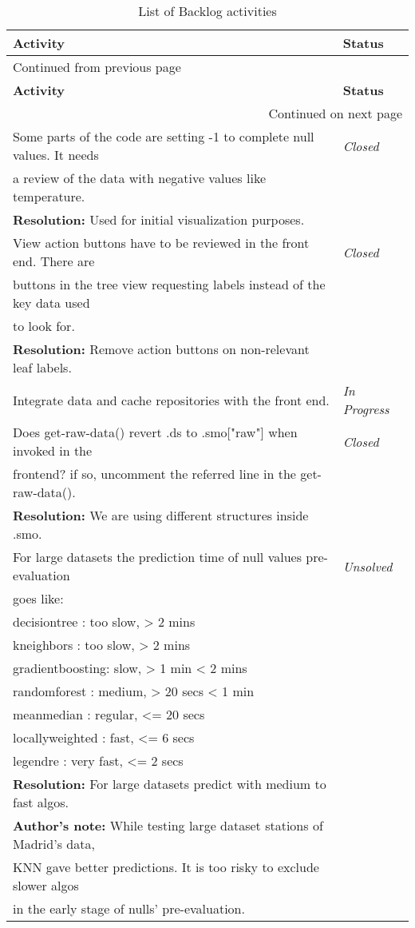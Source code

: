 \documentclass[a4paper]{article}
\begin{document}
\sffamily
\begin{longtable}{ll}
\caption{List of Backlog activities}
\\[0pt]
\hline
\textbf{Activity} & \textbf{Status}\\[0pt]
\hline
\endfirsthead
\multicolumn{2}{l}{Continued from previous page} \\[0pt]
\hline

\textbf{Activity} & \textbf{Status} \\[0pt]

\hline
\endhead
\hline\multicolumn{2}{r}{Continued on next page} \\
\endfoot
\endlastfoot
\hline
Some parts of the code are setting -1 to complete null values. It needs & \emph{Closed}\\[0pt]
a review of the data with negative values like temperature. & \\[0pt]
\textbf{Resolution:} Used for initial visualization purposes. & \\[0pt]
\hline
View action buttons have to be reviewed in the front end. There are & \emph{Closed}\\[0pt]
buttons in the tree view requesting labels instead of the key data used & \\[0pt]
to look for. & \\[0pt]
\textbf{Resolution:} Remove action buttons on non-relevant leaf labels. & \\[0pt]
\hline
Integrate data and cache repositories with the front end. & \emph{In Progress}\\[0pt]
\hline
Does get-raw-data() revert .ds to .smo["raw"] when invoked in the & \emph{Closed}\\[0pt]
frontend? if so, uncomment the referred line in the get-raw-data(). & \\[0pt]
\textbf{Resolution:} We are using different structures inside .smo. & \\[0pt]
\hline
For large datasets the prediction time of null values pre-evaluation & \emph{Unsolved}\\[0pt]
goes like: & \\[0pt]
decisiontree    : too slow,  >   2 mins & \\[0pt]
kneighbors      : too slow,  >   2 mins & \\[0pt]
gradientboosting: slow,      >   1 min  < 2 mins & \\[0pt]
randomforest    : medium,    >  20 secs < 1 min & \\[0pt]
meanmedian      : regular,   <= 20 secs & \\[0pt]
locallyweighted : fast,      <=  6 secs & \\[0pt]
legendre        : very fast, <=  2 secs & \\[0pt]
\textbf{Resolution:} For large datasets predict with medium to fast algos. & \\[0pt]
\textbf{Author's note:} While testing large dataset stations of Madrid's data, & \\[0pt]
KNN gave better predictions. It is too risky to exclude slower algos & \\[0pt]
in the early stage of nulls' pre-evaluation. & \\[0pt]
\hline
\end{longtable}
\rmfamily
\end{document}
